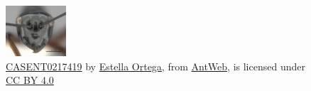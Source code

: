 \begin{figure}%
\centering%
\includegraphics[width=0.2\textwidth]{assets/images/CASENT0217419.jpg}%
\caption{\href{https://www.antweb.org/bigPicture.do?name=casent0217419&shot=h&number=1}{CASENT0217419} by \href{https://www.antweb.org/artist.do?id=92}{Estella Ortega}, from \href{https://www.antweb.org}{AntWeb}, is licensed under \href{https://creativecommons.org/licenses/by/4.0/}{CC BY 4.0}}%
\end{figure}